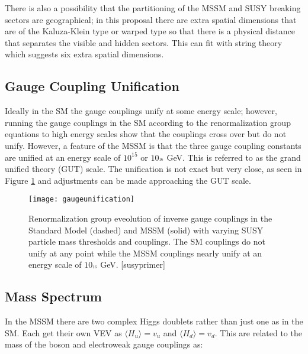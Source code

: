 There is also a possibility that the partitioning of the MSSM and SUSY breaking sectors are geographical; in this proposal there are extra spatial dimensions that are of the Kaluza-Klein type or warped type so that there is a physical distance that separates the visible and hidden sectors.  This can fit with string theory which suggests six extra spatial dimensions. \\







\subsection{Gauge Coupling Unification}

Ideally in the SM the gauge couplings unify at some energy scale; however, running the gauge couplings in the SM according to the renormalization group equations to high energy scales show that the couplings cross over but do not unify.  However, a feature of the MSSM is that the three gauge coupling constants are unified at an energy scale of $10^{15}$ or $10_^{16}$ GeV.  This is referred to as the grand unified theory (GUT) scale.  The unification is not exact but very close, as seen in Figure \ref{fig:unification} and adjustments can be made approaching the GUT scale.  

\begin{figure}[tbh]
	\centering
	\texttt{[image: gaugeunification]}
	\caption{Renormalization group eveolution of inverse gauge couplings in the Standard Model (dashed) and MSSM (solid) with varying SUSY particle mass thresholds and couplings.  The SM couplings do not unify at any point while the MSSM couplings nearly unify at an energy scale of $10_^{16}$ GeV.  [susyprimer] \color{red}{Replace with higher resolution image.} }
	\label{fig:unification}
\end{figure}

\subsection{Mass Spectrum}

In the MSSM there are two complex Higgs doublets rather than just one as in the SM.  Each get their own VEV as $\langle H_{u} \rangle = v_{u}$ and $\langle H_{d} \rangle = v_{d}$.  This are related to the mass of the {\Zboson} boson and electroweak gauge couplings as:

